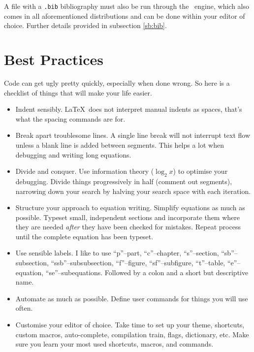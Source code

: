 A file with a \verb|.bib| bibliography must also be run through the
\BibTeX~engine, which also comes in all aforementioned distributions
and can be done within your editor of choice.  Further details
provided in subsection \ref{sb:bib}.
%
\section{Best Practices}\label{s:bestpract}
%
Code can get ugly pretty quickly, especially when done wrong.  So here
is a checklist of things that will make your life easier.
\begin{itemize}
\item Indent sensibly. \LaTeX~does not interpret manual indents as
  spaces, that's what the spacing commands are for.
\item Break apart troublesome lines.  A single line break will not
  interrupt text flow unless a blank line is added between segments.
  This helps a lot when debugging and writing long equations.
\item Divide and conquer.  Use information theory ($\log_{2} x$) to
  optimise your debugging.  Divide things progressively in half
  (comment out segments), narrowing down your search by halving your
  search space with each iteration.
\item Structure your approach to equation writing.  Simplify equations
  as much as possible.  Typeset small, independent sections and
  incorporate them where they are needed \emph{after} they have been
  checked for mistakes.  Repeat process until the complete equation
  has been typeset.
\item Use sensible labels.  I like to use ``p''--part, ``c''--chapter,
  ``s''--section, ``sb''--subsection, ``ssb''--subsubsection,
  ``f''--figure, ``sf''--subfigure, ``t''--table, ``e''--equation,
  ``se''--subequations.  Followed by a colon and a short but
  descriptive name.
\item Automate as much as possible.  Define user commands for things
  you will use often.
\item Customise your editor of choice.  Take time to set up your
  theme, shortcuts, custom macros, auto-complete, compilation train,
  flags, dictionary, etc.  Make sure you learn your most used
  shortcuts, macros, and commands.
\end{itemize}
%
